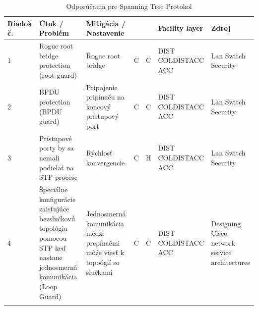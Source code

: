 \newpage
\begin{longtable}[!htbp]{|C{2.5em}L{9em}L{9em}C{2em}C{2.5em}C{7.5em}L{10em}|}
	
	\hline
	\centering
	
	Riadok č.	&Útok / Problém	&Mitigácia / Nastavenie	& 	&	&Facility layer	&Zdroj\\
	\endhead
	
	 1	&Rogue root bridge protection (root guard)	&Rogue root bridge 	&C	&C	&DIST
	COLDISTACC
	ACC	&Lan Switch Security \cite{Vyncke2008}\\
	2	&BPDU protection (BPDU guard)	&Pripojenie pripínaču na koncový prístupový port	&C	&C	&DIST
	COLDISTACC
	ACC	&Lan Switch Security \cite{Vyncke2008}\\
	 3	&Prístupové porty by sa nemali podielať na STP procese	&Rýchlosť konvergencie	&C	&H	&DIST
	COLDISTACC
	ACC	&Lan Switch Security \cite{Vyncke2008}\\
	4	&Špeciálne konfigurácie zaisťujúce bezslučkovú topológiu pomocou STP keď nastane jednosmerná komunikácia (Loop Guard)	&Jednosmerná komunikácia medzi prepínačmi môźe viesť k topoógií so slučkami	&C	&C	&DIST
	COLDISTACC
	ACC	&Designing Cisco network service architectures \cite{Tiso2012}\\
	
	\hline
	\caption{Odporúčania pre Spanning Tree Protokol}
	\label{tab:stp}%
\end{longtable}%

